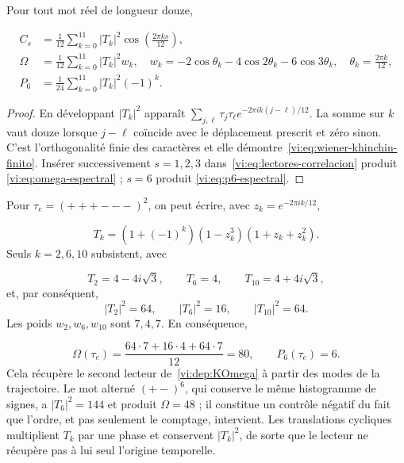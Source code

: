 \begin{proposition}
Pour tout mot réel de longueur douze,

\begin{align}
 C_s&=\frac1{12}\sum_{k=0}^{11}|T_k|^2
          \cos\!\left(\frac{2\pi ks}{12}\right),\label{vi:eq:wiener-khinchin-finito}\\
 \Omega&=\frac1{12}\sum_{k=0}^{11}|T_k|^2w_k,
 \quad
 w_k=-2\cos\theta_k-4\cos2\theta_k-6\cos3\theta_k,
 \quad\theta_k=\frac{2\pi k}{12},\label{vi:eq:omega-espectral}\\
 P_6&=\frac1{24}\sum_{k=0}^{11}|T_k|^2(-1)^k.
 \label{vi:eq:p6-espectral}
\end{align}
\end{proposition}
\begin{proof}
En développant $|T_k|^2$ apparaît
$\sum_{j,\ell}\tau_j\tau_\ell e^{-2\pi ik(j-\ell)/12}$.
La somme sur $k$ vaut douze lorsque $j-\ell$ coïncide avec le déplacement
prescrit et zéro sinon. C’est l’orthogonalité finie des caractères
et elle démontre~\eqref{vi:eq:wiener-khinchin-finito}. Insérer successivement
$s=1,2,3$ dans~\eqref{vi:eq:lectores-correlacion} produit
\eqref{vi:eq:omega-espectral} ; $s=6$ produit
\eqref{vi:eq:p6-espectral}.

\end{proof}

Pour $\tau_e=(+++---)^2$, on peut écrire, avec
$z_k=e^{-2\pi ik/12}$,

\begin{equation}
 T_k=(1+(-1)^k)(1-z_k^3)(1+z_k+z_k^2).
 \label{vi:eq:factorizacion-tk-electron}
\end{equation}
Seuls $k=2,6,10$ subsistent, avec

\[
 T_2=4-4i\sqrt3,\qquad T_6=4,\qquad
 T_{10}=4+4i\sqrt3,
\]
et, par conséquent,
\begin{equation}
 |T_2|^2=64,\qquad |T_6|^2=16,\qquad |T_{10}|^2=64.
 \label{vi:eq:potencias-espectrales-electron}
\end{equation}
Les poids $w_2,w_6,w_{10}$ sont $7,4,7$. En conséquence,

\begin{equation}
 \Omega(\tau_e)=\frac{64\cdot7+16\cdot4+64\cdot7}{12}=80,
 \qquad P_6(\tau_e)=6.
 \label{vi:eq:omega-p6-electron}
\end{equation}
Cela récupère le second lecteur de~\eqref{vi:dep:KOmega} à partir des modes
de la trajectoire. Le mot alterné $(+-)^6$, qui conserve le même
histogramme de signes, a $|T_6|^2=144$ et produit $\Omega=48$ ; il constitue
un contrôle négatif du fait que l’ordre, et pas seulement le comptage, intervient.
Les translations cycliques multiplient $T_k$ par une phase et conservent
$|T_k|^2$, de sorte que le lecteur ne récupère pas à lui seul l’origine temporelle.


